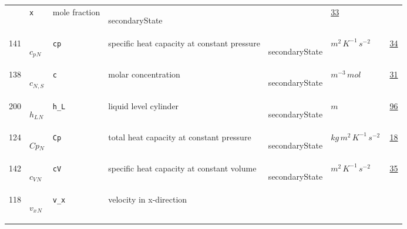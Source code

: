 \begin{longtable}{|p{1cm}|p{2.5cm}|p{4.5cm}|p{8cm}|p{3.0cm}|p{3cm}|p{1cm}|}
             & \verb|x|
             & mole fraction
             & \begin{lay}secondaryState \end{lay}
             & $  $
             &                 \hyperlink{"e:33"}{ 33 }
                 \\
            141
             & \hypertarget{"v:141"}{ $ {{c_p}}{_{N}} $}
             & \verb|cp|
             & specific heat capacity at constant pressure
             & \begin{lay}secondaryState \end{lay}
             & $ m^{2} \,K^{-1} \,s^{-2} \, $
             &                 \hyperlink{"e:34"}{ 34 }
                 \\
            138
             & \hypertarget{"v:138"}{ $ {c}{_{N, S}} $}
             & \verb|c|
             & molar concentration
             & \begin{lay}secondaryState \end{lay}
             & $ m^{-3} \,mol \, $
             &                 \hyperlink{"e:31"}{ 31 }
                 \\
            200
             & \hypertarget{"v:200"}{ $ {h_L}{_{N}} $}
             & \verb|h_L|
             & liquid level cylinder
             & \begin{lay}secondaryState \end{lay}
             & $ m  $
             &                 \hyperlink{"e:96"}{ 96 }
                 \\
            124
             & \hypertarget{"v:124"}{ $ {Cp}{_{N}} $}
             & \verb|Cp|
             & total heat capacity at constant pressure
             & \begin{lay}secondaryState \end{lay}
             & $ kg \,m^{2} \,K^{-1} \,s^{-2} \, $
             &                 \hyperlink{"e:18"}{ 18 }
                 \\
            142
             & \hypertarget{"v:142"}{ $ {{c_V}}{_{N}} $}
             & \verb|cV|
             & specific heat capacity at constant volume
             & \begin{lay}secondaryState \end{lay}
             & $ m^{2} \,K^{-1} \,s^{-2} \, $
             &                 \hyperlink{"e:35"}{ 35 }
                 \\
            118
             & \hypertarget{"v:118"}{ $ {{v_x}}{_{N}} $}
             & \verb|v_x|
             & velocity in x-direction

\end{longtable}
